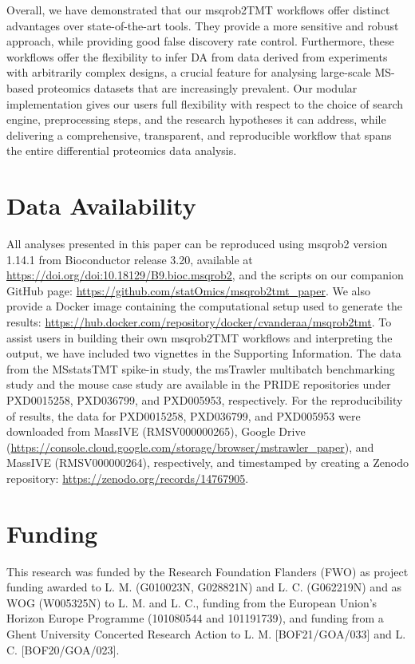 \documentclass[
  letterpaper,
  DIV=11,
  numbers=noendperiod]{scrartcl}
\begin{document}
Overall, we have demonstrated that our msqrob2TMT workflows offer
distinct advantages over state-of-the-art tools. They provide a more
sensitive and robust approach, while providing good false discovery rate
control. Furthermore, these workflows offer the flexibility to infer DA
from data derived from experiments with arbitrarily complex designs, a
crucial feature for analysing large-scale MS-based proteomics datasets
that are increasingly prevalent. Our modular implementation gives our
users full flexibility with respect to the choice of search engine,
preprocessing steps, and the research hypotheses it can address, while
delivering a comprehensive, transparent, and reproducible workflow that
spans the entire differential proteomics data analysis.

\section{Data Availability}

All analyses presented in this paper can be reproduced using msqrob2
version 1.14.1 from Bioconductor release 3.20, available at
\url{https://doi.org/doi:10.18129/B9.bioc.msqrob2}, and the scripts on
our companion GitHub page:
\url{https://github.com/statOmics/msqrob2tmt_paper}. We also provide a
Docker image containing the computational setup used to generate the
results:
\url{https://hub.docker.com/repository/docker/cvanderaa/msqrob2tmt}. To
assist users in building their own msqrob2TMT workflows and interpreting
the output, we have included two vignettes in the Supporting
Information. The data from the MSstatsTMT spike-in study, the msTrawler
multibatch benchmarking study and the mouse case study are available in
the PRIDE repositories under PXD0015258, PXD036799, and PXD005953,
respectively. For the reproducibility of results, the data for
PXD0015258, PXD036799, and PXD005953 were downloaded from MassIVE
(RMSV000000265), Google Drive
(\url{https://console.cloud.google.com/storage/browser/mstrawler_paper}),
and MassIVE (RMSV000000264), respectively, and timestamped by creating a
Zenodo repository: \url{https://zenodo.org/records/14767905}.

\section{Funding}

This research was funded by the Research Foundation Flanders (FWO) as
project funding awarded to L. M. (G010023N, G028821N) and L. C.
(G062219N) and as WOG (W005325N) to L. M. and L. C., funding from the
European Union's Horizon Europe Programme (101080544 and 101191739), and
funding from a Ghent University Concerted Research Action to L. M.
{[}BOF21/GOA/033{]} and L. C. {[}BOF20/GOA/023{]}.
\end{document}
